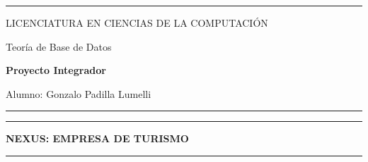 \documentclass[11pt]{article}
\begin{document}

\vspace{2cm}

\begin{singlespace}
\begin{center}
\rule{1\columnwidth}{2pt}
\par\end{center}

\begin{center}
{\Large{}LICENCIATURA EN CIENCIAS DE LA COMPUTACIÓN}{\Large\par}
\par\end{center}

\begin{center}
{\Large{}Teoría de Base de Datos}{\Large\par}
\par\end{center}

\begin{center}
\textbf{\large Proyecto Integrador}   \end{center}

\begin{center}
Alumno: Gonzalo Padilla Lumelli
\par\end{center}

\begin{center}
\rule{1\columnwidth}{2pt}    
\end{center}

\vspace{10em}

\begin{center}
\rule{1\columnwidth}{4pt}    
\end{center}

\begin{center}
\Large \textbf{NEXUS: EMPRESA DE TURISMO}
\par\end{center}

\begin{center}
\rule{1\columnwidth}{4pt}    
\end{center}

\end{singlespace}
\end{document}

